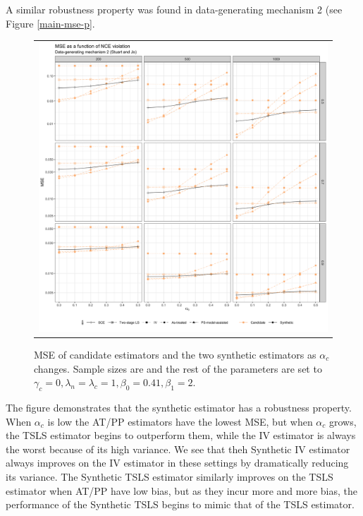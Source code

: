 \documentclass{article}
\begin{document}
A similar robustness property was found in data-generating mechanism 2 (see Figure \ref{main-mse-p}. 
%
\begin{figure}
\centering
\begin{tabular}{c}
\includegraphics[width =\textwidth]{figures/main-sim-mse-plot.png}
\end{tabular}\vspace{0.2in}
\caption{MSE of candidate estimators and the two synthetic estimators as $\alpha_c$ changes. Sample sizes are  and the rest of the parameters are set to $\gamma_c = 0, \lambda_n = \lambda_c = 1, \beta_0 = 0.41, \beta_1 = 2$.}\label{main-mse-pl}
\end{figure}
%
The figure demonstrates that the synthetic estimator has a robustness property. When $\alpha_c$ is low the AT/PP estimators have the lowest MSE, but when $\alpha_c$ grows, the TSLS estimator begins to outperform them, while the IV estimator is always the worst because of its high variance. We see that theh Synthetic IV estimator always improves on the IV estimator in these settings by dramatically reducing its variance. The Synthetic TSLS estimator similarly improves on the TSLS estimator when AT/PP have low bias, but as they incur more and more bias, the performance of the Synthetic TSLS begins to mimic that of the TSLS estimator. 
\end{document}
